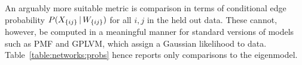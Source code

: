 An arguably more suitable metric is comparison in terms of conditional edge probability \ie ${P(X_{\lbrace ij \rbrace} \,|\, W_{\lbrace ij \rbrace})}$ for all $i,j$ in the held out data. These cannot, however, be computed in a meaningful manner for
standard versions of models such as PMF and GPLVM, which assign a Gaussian likelihood to data. Table~\ref{table:networks:probs} hence reports only comparisons to the eigenmodel.

